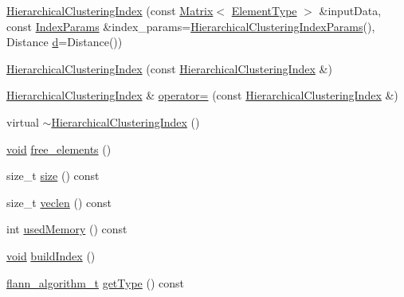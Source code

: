 \begin{DoxyCompactItemize}
\item 
\hyperlink{classcvflann_1_1HierarchicalClusteringIndex_ab4542350c465b556bdad9364ee6538ec}{Hierarchical\-Clustering\-Index} (const \hyperlink{classcvflann_1_1Matrix}{Matrix}$<$ \hyperlink{classcvflann_1_1HierarchicalClusteringIndex_a8b00f29310310cb2b1ebf3bfc61ec2ed}{Element\-Type} $>$ \&input\-Data, const \hyperlink{namespacecvflann_a742b4c7076c21012054af74a9ee48289}{Index\-Params} \&index\-\_\-params=\hyperlink{structcvflann_1_1HierarchicalClusteringIndexParams}{Hierarchical\-Clustering\-Index\-Params}(), Distance \hyperlink{legacy_8hpp_a6f364afbe132c4ecfea48bde1b0618ba}{d}=Distance())
\item 
\hyperlink{classcvflann_1_1HierarchicalClusteringIndex_a399bc070378dc578098e829974e53b02}{Hierarchical\-Clustering\-Index} (const \hyperlink{classcvflann_1_1HierarchicalClusteringIndex}{Hierarchical\-Clustering\-Index} \&)
\item 
\hyperlink{classcvflann_1_1HierarchicalClusteringIndex}{Hierarchical\-Clustering\-Index} \& \hyperlink{classcvflann_1_1HierarchicalClusteringIndex_a3b66c3e46d85547b53bce25e4681f4ea}{operator=} (const \hyperlink{classcvflann_1_1HierarchicalClusteringIndex}{Hierarchical\-Clustering\-Index} \&)
\item 
virtual \hyperlink{classcvflann_1_1HierarchicalClusteringIndex_a51bd5c842b324a0d1f2869e20102be90}{$\sim$\-Hierarchical\-Clustering\-Index} ()
\item 
\hyperlink{legacy_8hpp_a8bb47f092d473522721002c86c13b94e}{void} \hyperlink{classcvflann_1_1HierarchicalClusteringIndex_a085dd40374648c92ea3a649ba80ac456}{free\-\_\-elements} ()
\item 
size\-\_\-t \hyperlink{classcvflann_1_1HierarchicalClusteringIndex_aa79541da9d11fa1f74b5565805e7e8be}{size} () const 
\item 
size\-\_\-t \hyperlink{classcvflann_1_1HierarchicalClusteringIndex_ad781ea5411f66fcb8f1d4dae9312498f}{veclen} () const 
\item 
int \hyperlink{classcvflann_1_1HierarchicalClusteringIndex_aceddef1308678b0ad8629ae6a32178f5}{used\-Memory} () const 
\item 
\hyperlink{legacy_8hpp_a8bb47f092d473522721002c86c13b94e}{void} \hyperlink{classcvflann_1_1HierarchicalClusteringIndex_ad306898d16cd94b44e0a4a678e9bdca6}{build\-Index} ()
\item 
\hyperlink{namespacecvflann_a4e3e6c98d774ea77fd7f0045c9bc7817}{flann\-\_\-algorithm\-\_\-t} \hyperlink{classcvflann_1_1HierarchicalClusteringIndex_a19238f026b1b894bf7cbff71b3cd67ec}{get\-Type} () const 

\end{DoxyCompactItemize}
